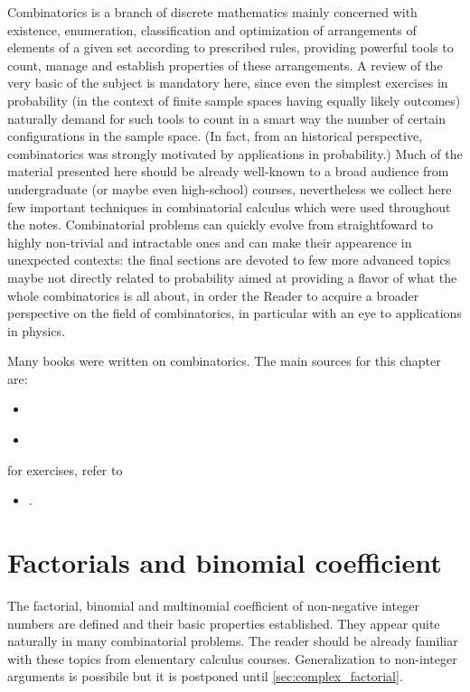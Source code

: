 


\begin{refsection}

Combinatorics is a branch of discrete mathematics mainly concerned with existence,
enumeration, classification and optimization of arrangements of
elements  of a given set according to 
prescribed rules, providing powerful tools to count, manage and establish
properties of these
arrangements. 
A review of the very basic  of the subject is mandatory here, since 
even the simplest exercises in probability (in the context of finite sample spaces having equally likely outcomes)
naturally demand for such tools to count in a smart way the number of certain
configurations in the sample space. 
(In fact, from an historical perspective, combinatorics was strongly motivated
by applications in 
probability.)
Much of the material presented here should be already well-known to a broad audience from
undergraduate (or maybe even high-school) courses, nevertheless we collect here
few important techniques  in combinatorial calculus which were used throughout the notes. 
Combinatorial problems can
quickly evolve 
from straightfoward to highly non-trivial and intractable ones and can make
their appearence in unexpected contexts: the final sections are devoted to few
more advanced topics maybe not directly related to probability aimed at
providing a 
flavor of what the whole combinatorics is all about, in order the Reader to acquire a broader
perspective 
on the field of combinatorics, in
particular with an eye to applications in physics. 

Many books were written on combinatorics. 
The main sources for this chapter are:
\begin{itemize}
   \item\textcite[][\S~1]{Comtet:1974}
   \item\textcite[][\S~2]{Feller:1966}
\end{itemize}
for exercises, refer \eg{} to 
\begin{itemize}
   \item\textcite[][\S~1]{Ross:2010}.
\end{itemize}


\section{Factorials and binomial coefficient}
The factorial, binomial and multinomial coefficient of non-negative integer numbers are defined and their basic
properties established. 
They appear quite naturally in many combinatorial problems. 
The reader should be already familiar with these topics from elementary calculus
courses. 
Generalization to non-integer arguments 
is possibile but it is postponed until  \cref{sec:complex_factorial}.



\end{refsection}
